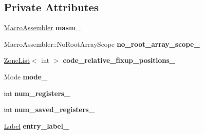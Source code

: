 \subsection*{Private Attributes}
\begin{DoxyCompactItemize}
\item 
\hyperlink{classv8_1_1internal_1_1_macro_assembler}{Macro\+Assembler} {\bfseries masm\+\_\+}\hypertarget{classv8_1_1internal_1_1_reg_exp_macro_assembler_x64_a5184813cdc3a6c4f8b65426a46bba07c}{}\label{classv8_1_1internal_1_1_reg_exp_macro_assembler_x64_a5184813cdc3a6c4f8b65426a46bba07c}

\item 
Macro\+Assembler\+::\+No\+Root\+Array\+Scope {\bfseries no\+\_\+root\+\_\+array\+\_\+scope\+\_\+}\hypertarget{classv8_1_1internal_1_1_reg_exp_macro_assembler_x64_ac84e294b31fc965815d6937a1cfd3202}{}\label{classv8_1_1internal_1_1_reg_exp_macro_assembler_x64_ac84e294b31fc965815d6937a1cfd3202}

\item 
\hyperlink{classv8_1_1internal_1_1_zone_list}{Zone\+List}$<$ int $>$ {\bfseries code\+\_\+relative\+\_\+fixup\+\_\+positions\+\_\+}\hypertarget{classv8_1_1internal_1_1_reg_exp_macro_assembler_x64_a731c51cc0a9b2be9080882bd4afdd78d}{}\label{classv8_1_1internal_1_1_reg_exp_macro_assembler_x64_a731c51cc0a9b2be9080882bd4afdd78d}

\item 
Mode {\bfseries mode\+\_\+}\hypertarget{classv8_1_1internal_1_1_reg_exp_macro_assembler_x64_a9375cd77c629bec4976950717d77d2ce}{}\label{classv8_1_1internal_1_1_reg_exp_macro_assembler_x64_a9375cd77c629bec4976950717d77d2ce}

\item 
int {\bfseries num\+\_\+registers\+\_\+}\hypertarget{classv8_1_1internal_1_1_reg_exp_macro_assembler_x64_a8f80e90b0115f989b0cdfd7a4fc22b26}{}\label{classv8_1_1internal_1_1_reg_exp_macro_assembler_x64_a8f80e90b0115f989b0cdfd7a4fc22b26}

\item 
int {\bfseries num\+\_\+saved\+\_\+registers\+\_\+}\hypertarget{classv8_1_1internal_1_1_reg_exp_macro_assembler_x64_abc1231e26f69f85bdaad1afa9a480d5e}{}\label{classv8_1_1internal_1_1_reg_exp_macro_assembler_x64_abc1231e26f69f85bdaad1afa9a480d5e}

\item 
\hyperlink{classv8_1_1internal_1_1_label}{Label} {\bfseries entry\+\_\+label\+\_\+}\hypertarget{classv8_1_1internal_1_1_reg_exp_macro_assembler_x64_a8847a5571174577ab13b902506610fa7}{}\label{classv8_1_1internal_1_1_reg_exp_macro_assembler_x64_a8847a5571174577ab13b902506610fa7}


\end{DoxyCompactItemize}
